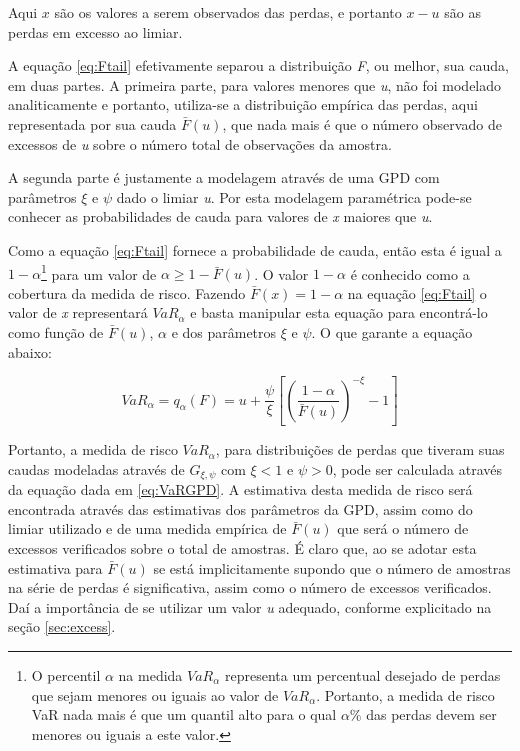 \documentclass[1p]{elsarticle}
\theoremstyle{definition}
\begin{document}
Aqui $x$ são os valores a serem observados das perdas, e portanto $x-u$ são as perdas em excesso ao limiar.

A equação \eqref{eq:Ftail} efetivamente separou a distribuição \emph{F}, ou melhor, sua cauda, em duas partes. A primeira parte, para valores menores que \emph{u}, não foi modelado analiticamente e portanto, utiliza-se a distribuição empírica das perdas, aqui representada por sua cauda $\bar{F}(u)$, que nada mais é que o número observado de excessos de \emph{u} sobre o número total de observações da amostra.

A segunda parte é justamente a modelagem através de uma GPD com parâmetros $\xi$ e $\psi$ dado o limiar \emph{u}. Por esta modelagem paramétrica pode-se conhecer as probabilidades de cauda para valores de \emph{x} maiores que \emph{u}.

Como a equação \eqref{eq:Ftail} fornece a probabilidade de cauda, então esta é igual a $1- \alpha$\footnote{O percentil $\alpha$ na medida $VaR_\alpha$ representa um percentual desejado de perdas que sejam menores ou iguais ao valor de $VaR_\alpha$. Portanto, a medida de risco VaR nada mais é que um quantil alto para o qual $\alpha \%$ das perdas devem ser menores ou iguais a este valor.} para um valor de $\alpha  \geq 1-\bar{F}(u)$. O valor $1- \alpha$ é conhecido como a cobertura da medida de risco. Fazendo $\bar{F}(x)=1-\alpha$ na equação \eqref{eq:Ftail} o valor de \emph{x} representará $VaR_\alpha$ e basta manipular esta equação para encontrá-lo como função de $\bar{F}(u)$, $\alpha$ e dos parâmetros $\xi$ e $\psi$. O que garante a equação abaixo:

\begin{equation}
\label{eq:VaRGPD}
VaR_\alpha = q_\alpha(F) = u+\frac{\psi}{\xi}\left[ \left( \frac{1-\alpha}{\bar{F}(u)}\right)^{-\xi}-1 \right]
\end{equation}

Portanto, a medida de risco $VaR_\alpha$, para distribuições de perdas que tiveram suas caudas modeladas através de $G_{\xi, \psi}$ com $\xi <1 \text{ e } \psi > 0$, pode ser calculada através da equação dada em \eqref{eq:VaRGPD}. A estimativa desta medida de risco será encontrada através das estimativas dos parâmetros da GPD, assim como do limiar utilizado e de uma medida empírica de $\bar{F}(u)$ que será o número de excessos verificados sobre o total de amostras. É claro que, ao se adotar esta estimativa para $\bar{F}(u)$ se está implicitamente supondo que o número de amostras na série de perdas é significativa, assim como o número de excessos verificados. Daí a importância de se utilizar um valor \emph{u} adequado, conforme explicitado na seção \ref{sec:excess}.
\end{document}
